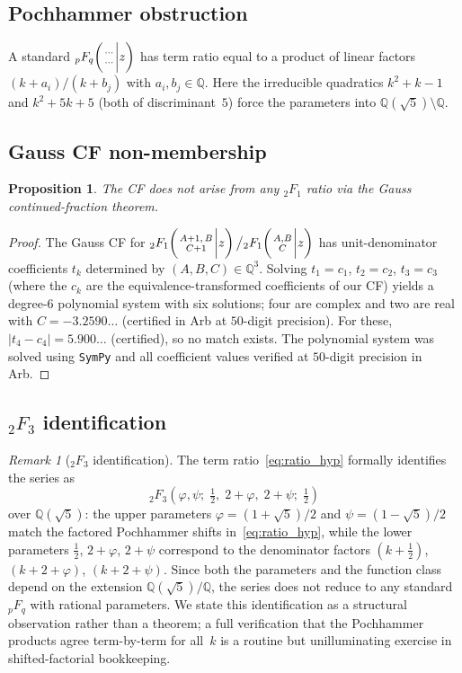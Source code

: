 \documentclass[11pt,a4paper]{article}
\theoremstyle{plain}
\newtheorem{proposition}[theorem]{Proposition}
\theoremstyle{definition}
\theoremstyle{remark}
\newtheorem{remark}[theorem]{Remark}
\newcommand{\half}{\tfrac{1}{2}}
\newcommand{\hyp}[5]{{{}_{#1}F_{#2}}\!\left(\genfrac{}{}{0pt}{}{#3}{#4}\bigg|#5\right)}
\begin{document}
\subsection{Pochhammer obstruction}

A standard $\hyp{p}{q}{\cdots}{\cdots}{z}$ has term ratio equal to
a product of linear factors $(k+a_i)/(k+b_j)$ with
$a_i,b_j\in\mathbb{Q}$.
Here the irreducible quadratics $k^2{+}k{-}1$ and $k^2{+}5k{+}5$
(both of discriminant~$5$) force the parameters into
$\mathbb{Q}(\sqrt5)\setminus\mathbb{Q}$.

\subsection{Gauss CF non-membership}

\begin{proposition}\label{prop:gauss}
The CF does not arise from any ${}_2F_1$ ratio via the Gauss
continued-fraction theorem.
\end{proposition}

\begin{proof}
The Gauss CF for
$\hyp21{A{+}1,\,B}{C{+}1}{z}\big/\hyp21{A,B}{C}{z}$
has unit-denominator coefficients $t_k$ determined by
$(A,B,C)\in\mathbb{Q}^3$.
Solving $t_1=c_1$, $t_2=c_2$, $t_3=c_3$ (where the $c_k$ are the
equivalence-transformed coefficients of our CF) yields a degree-6
polynomial system with six solutions; four are complex and two are
real with $C = -3.2590\ldots$ (certified in Arb at $50$-digit precision).
For these,
$|t_4 - c_4| = 5.900\ldots$ (certified), so no match exists.
The polynomial system was solved using \texttt{SymPy} and all
coefficient values verified at $50$-digit precision in Arb.
\end{proof}

\subsection{\texorpdfstring{${}_2F_3$}{2F3} identification}

\begin{remark}[${}_2F_3$ identification]\label{rem:2f3}
The term ratio~\eqref{eq:ratio_hyp} formally identifies the series as
\[
  {}_2F_3\!\left(\varphi,\psi;\;\half,\;2{+}\varphi,\;2{+}\psi;\;
  \half\right)
\]
over $\mathbb{Q}(\sqrt5)$: the upper parameters
$\varphi = (1{+}\sqrt5)/2$ and $\psi = (1{-}\sqrt5)/2$ match the
factored Pochhammer shifts in~\eqref{eq:ratio_hyp}, while the lower
parameters $\frac{1}{2}$, $2{+}\varphi$, $2{+}\psi$ correspond to the
denominator factors $(k{+}\frac{1}{2})$, $(k{+}2{+}\varphi)$,
$(k{+}2{+}\psi)$.
Since both the parameters and the function class depend on the
extension $\mathbb{Q}(\sqrt5)/\mathbb{Q}$, the series does not
reduce to any standard ${}_pF_q$ with rational parameters.
We state this identification as a structural observation rather than
a theorem; a full verification that the Pochhammer products agree
term-by-term for all~$k$ is a routine but unilluminating exercise in
shifted-factorial bookkeeping.
\end{remark}
\end{document}
